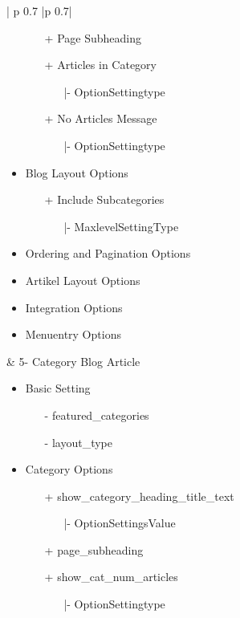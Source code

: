\begin{minipage}{0.8\textwidth}
\begin{longtable}{| p {0.7\textwidth} |p {0.7\textwidth}|}
\begin{itemize}
\begin{enumerate}
\begin{enumerate}
			\end{enumerate}
		\item[+] Page Subheading
	   	\item[+] Articles in Category
	   		\begin{enumerate}
	   			\item[|-] OptionSettingtype
	   		\end{enumerate}
	   	\item[+] No Articles Message
	   		\begin{enumerate}
	   			\item[|-] OptionSettingtype
	   		\end{enumerate}
	\end{enumerate}
\item Blog Layout Options
	\begin{enumerate}
		\item[+] Include Subcategories
			\begin{enumerate}
			\item[|-] MaxlevelSettingType
			\end{enumerate}
	\end{enumerate}
\item Ordering and Pagination Options
\item Artikel Layout Options
\item Integration Options
\item Menuentry Options  
\end{itemize}
&
5- Category Blog Article
\begin{itemize}
\item Basic Setting
	\begin{enumerate}
		\item[-] featured\_categories
		\item[-] layout\_type 
	 \end{enumerate}
\item Category Options
	\begin{enumerate}
		\item[+] show\_category\_heading\_title\_text
			\begin{enumerate}
			\item[|-] OptionSettingsValue
			\end{enumerate}
		\item[+] page\_subheading
		\item[+] show\_cat\_num\_articles
	   		\begin{enumerate}
	   			\item[|-] OptionSettingtype
	   		\end{enumerate}

\end{enumerate}
\end{itemize}
\end{longtable}
\end{minipage}
